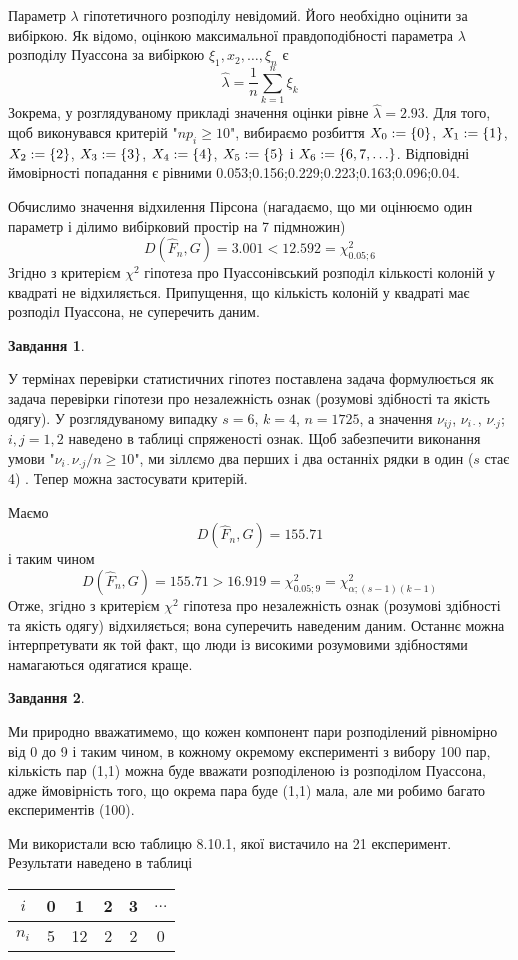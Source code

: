 \documentclass[12pt]{article} %
\newtheorem{prob}{Завдання}
\begin{document}
	Параметр $\lambda$ гіпотетичного розподілу невідомий. Його необхідно оцінити за вибіркою. Як відомо, оцінкою максимальної правдоподібності
	параметра $\lambda$ розподілу Пуассона за вибіркою $\xi_1,x_2,\hdots,\xi_n$ є
	\[\hat{\lambda}=\frac{1}{n}\sum_{k=1}^n\xi_k\]
	Зокрема, у розглядуваному прикладі значення оцінки рівне $\hat{\lambda}=2.93$. Для того, щоб виконувався критерій "$np_i\geq10$",
	вибираємо розбиття $X_0:=\left\{0\right\}$, $X_1:=\left\{1\right\}$, $X_2:=\left\{2\right\}$,
	$X_3:=\left\{3\right\}$, $X_4:=\left\{4\right\}$, $X_5:=\left\{5\right\}$ і $X_6:=\left\{6,7,\hdots\right\}$.
	Відповідні ймовірності попадання є рівними 0.053;0.156;0.229;0.223;0.163;0.096;0.04.

	Обчислимо значення відхилення Пірсона (нагадаємо, що ми оцінюємо один параметр і ділимо вибірковий простір на 7 підмножин)
	\[D(\hat{F}_n,G)=3.001<12.592=\chi^2_{0.05;6}\]
	Згідно з критерієм $\chi^2$ гіпотеза про Пуассонівський розподіл кількості колоній у квадраті не відхиляється. Припущення,
	що кількість колоній у квадраті має розподіл Пуассона, не суперечить даним.
\begin{prob}\end{prob}%
	У термінах перевірки статистичних гіпотез поставлена задача формулюється як задача перевірки гіпотези про незалежність ознак
	(розумові здібності та якість одягу). У розглядуваному випадку $s=6$, $k=4$, $n=1725$, а значення $\nu_{ij}$, $\nu_{i\cdot}$,
	$\nu_{\cdot j}$; $i,j=1,2$ наведено в таблиці спряженості ознак. Щоб забезпечити виконання умови
	"${\nu_{i\cdot}\nu_{\cdot j}/n\geq10}$", ми зіллємо два перших і два останніх рядки в один ($s$ стає 4)
	. Тепер можна застосувати критерій.
	
	Маємо
	\[D(\hat{F}_n,G)=155.71\]
	і таким чином
	\[D(\hat{F}_n,G)=155.71>16.919=\chi^2_{0.05;9}=\chi^2_{\alpha;(s-1)(k-1)}\]
	Отже, згідно з критерієм $\chi^2$ гіпотеза про незалежність ознак (розумові здібності та якість одягу) відхиляється; вона
	суперечить наведеним даним. Останнє можна інтерпретувати як той факт, що люди із високими розумовими здібностями намагаються
	одягатися краще.
\begin{prob}\end{prob}
	Ми природно вважатимемо, що кожен компонент пари розподілений рівномірно від 0 до 9 і таким чином, в кожному окремому
	експерименті з вибору 100 пар, кількість пар (1,1) можна буде вважати розподіленою із розподілом Пуассона, адже ймовірність
	того, що окрема пара буде (1,1) мала, але ми робимо багато експериментів (100).

	Ми використали всю таблицю 8.10.1, якої вистачило на 21 експеримент. Результати наведено в таблиці
	\begin{center}
	\begin{tabular}{|c|ccccc|}
		\hline
		$i$&0&1&2&3&$\hdots$\\\hline
		$n_i$&5&12&2&2&0\\\hline
	\end{tabular}
	\end{center}
\end{document}
